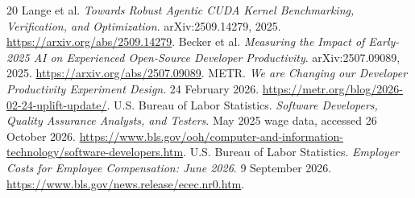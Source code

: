 \documentclass[11pt,letterpaper]{article}
\begin{document}
\begin{thebibliography}{20}
 Lange et al. \emph{Towards Robust Agentic CUDA Kernel Benchmarking, Verification, and Optimization}. arXiv:2509.14279, 2025. \url{https://arxiv.org/abs/2509.14279}.
 Becker et al. \emph{Measuring the Impact of Early-2025 AI on Experienced Open-Source Developer Productivity}. arXiv:2507.09089, 2025. \url{https://arxiv.org/abs/2507.09089}.
 METR. \emph{We are Changing our Developer Productivity Experiment Design}. 24 February 2026. \url{https://metr.org/blog/2026-02-24-uplift-update/}.
 U.S. Bureau of Labor Statistics. \emph{Software Developers, Quality Assurance Analysts, and Testers}. May 2025 wage data, accessed 26 October 2026. \url{https://www.bls.gov/ooh/computer-and-information-technology/software-developers.htm}.
 U.S. Bureau of Labor Statistics. \emph{Employer Costs for Employee Compensation: June 2026}. 9 September 2026. \url{https://www.bls.gov/news.release/ecec.nr0.htm}.
\end{thebibliography}
\end{document}
